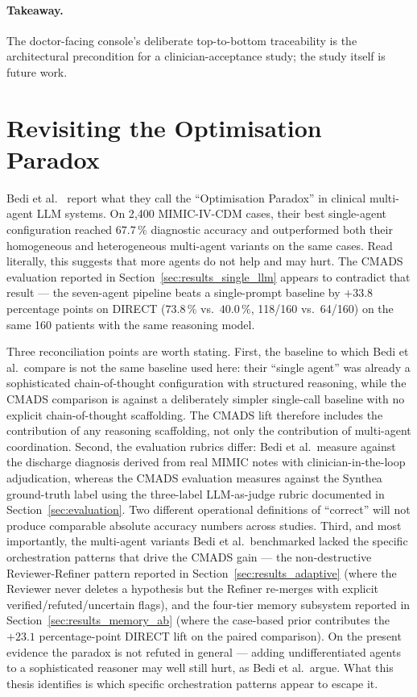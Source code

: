\paragraph{Takeaway.} The doctor-facing console's deliberate
top-to-bottom traceability is the architectural precondition for a
clinician-acceptance study; the study itself is future work.

\section{Revisiting the Optimisation Paradox}
\label{sec:discussion_paradox}

Bedi et al.~\cite{Bedi2025OptParadox} report what they call the
``Optimisation Paradox'' in clinical multi-agent LLM systems. On
2{,}400 MIMIC-IV-CDM cases, their best single-agent configuration
reached $67.7\,\%$ diagnostic accuracy and outperformed both their
homogeneous and heterogeneous multi-agent variants on the same
cases. Read literally, this suggests that more agents do not help
and may hurt. The CMADS evaluation reported in
Section~\ref{sec:results_single_llm} appears to contradict that
result --- the seven-agent pipeline beats a single-prompt baseline
by $+33.8$ percentage points on DIRECT ($73.8\,\%$ vs.\ $40.0\,\%$,
118/160 vs.\ 64/160) on the same 160 patients with the same
reasoning model.

Three reconciliation points are worth stating. First, the baseline
to which Bedi et al.\ compare is not the same baseline used here:
their ``single agent'' was already a sophisticated chain-of-thought
configuration with structured reasoning, while the CMADS comparison
is against a deliberately simpler single-call baseline with no
explicit chain-of-thought scaffolding. The CMADS lift therefore
includes the contribution of any reasoning scaffolding, not only
the contribution of multi-agent coordination. Second, the
evaluation rubrics differ: Bedi et al.\ measure against the
discharge diagnosis derived from real MIMIC notes with
clinician-in-the-loop adjudication, whereas the CMADS evaluation
measures against the Synthea ground-truth label using the
three-label LLM-as-judge rubric documented in
Section~\ref{sec:evaluation}. Two different operational definitions
of ``correct'' will not produce comparable absolute accuracy
numbers across studies. Third, and most importantly, the
multi-agent variants Bedi et al.\ benchmarked lacked the
specific orchestration patterns that drive the CMADS gain --- the
non-destructive Reviewer-Refiner pattern reported in
Section~\ref{sec:results_adaptive} (where the Reviewer never
deletes a hypothesis but the Refiner re-merges with explicit
verified/refuted/uncertain flags), and the four-tier memory
subsystem reported in Section~\ref{sec:results_memory_ab} (where
the case-based prior contributes the $+23.1$ percentage-point
DIRECT lift on the paired comparison). On the present evidence the
paradox is not refuted in general --- adding undifferentiated
agents to a sophisticated reasoner may well still hurt, as Bedi et
al.\ argue. What this thesis identifies is which specific
orchestration patterns appear to escape it.

